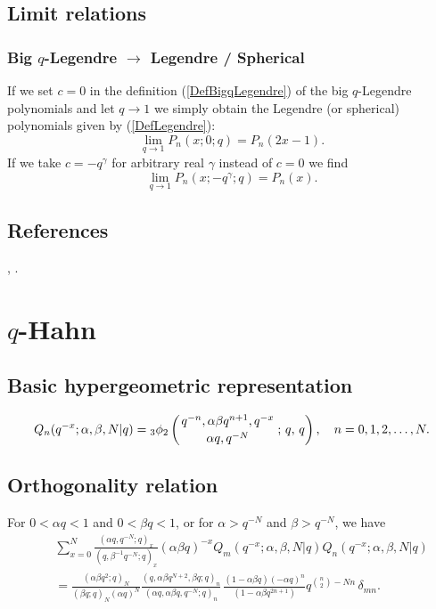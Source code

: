 \documentclass[envcountchap,graybox]{svmono}
\newcommand{\qhyp}[5]{\mbox{}_{#1}{\phi}_{#2}
\left(\genfrac{}{}{0pt}{}{#3}{#4}\,;\,q,\,#5\right)}
\begin{document}
\subsection*{Limit relations}

\subsubsection*{Big $q$-Legendre $\rightarrow$ Legendre / Spherical}
If we set $c=0$ in the definition (\ref{DefBigqLegendre}) of the big
$q$-Legendre polynomials and let $q\rightarrow 1$ we simply obtain the Legendre
(or spherical) polynomials given by (\ref{DefLegendre}):
\begin{equation}
\lim_{q\rightarrow 1}P_n(x;0;q)=P_n(2x-1).
\end{equation}
If we take $c=-q^{\gamma}$ for arbitrary real $\gamma$ instead of $c=0$ we
find
\begin{equation}
\lim_{q\rightarrow 1}P_n(x;-q^{\gamma};q)=P_n(x).
\end{equation}

\subsection*{References}
\cite{Koelink95I}, \cite{Koorn90II}.


\section{$q$-Hahn}
\par\setcounter{equation}{0}

\subsection*{Basic hypergeometric representation}
\begin{equation}
\label{DefqHahn}
Q_n(q^{-x};\alpha,\beta,N|q)=\qhyp{3}{2}{q^{-n},\alpha\beta q^{n+1},q^{-x}}
{\alpha q,q^{-N}}{q},\quad n=0,1,2,\ldots,N.
\end{equation}

\subsection*{Orthogonality relation}
For $0<\alpha q<1$ and $0<\beta q<1$, or for $\alpha>q^{-N}$ and $\beta>q^{-N}$, we have
\begin{eqnarray}
\label{OrtqHahn}
& &\sum_{x=0}^N\frac{(\alpha q,q^{-N};q)_x}{(q,\beta^{-1}q^{-N};q)_x}(\alpha\beta q)^{-x}
Q_m(q^{-x};\alpha,\beta,N|q)Q_n(q^{-x};\alpha,\beta,N|q)\nonumber\\
& &{}=\frac{(\alpha\beta q^2;q)_N}{(\beta q;q)_N(\alpha q)^N}
\frac{(q,\alpha\beta q^{N+2},\beta q;q)_n}{(\alpha q,\alpha\beta q,q^{-N};q)_n}\,
\frac{(1-\alpha\beta q)(-\alpha q)^n}{(1-\alpha\beta q^{2n+1})}
q^{\binom{n}{2}-Nn}\,\delta_{mn}.
\end{eqnarray}
\end{document}
